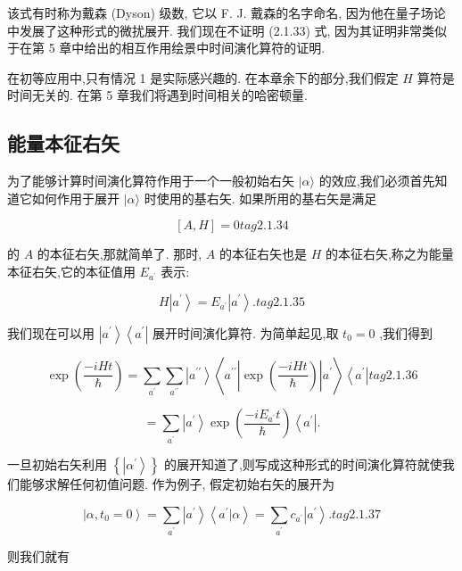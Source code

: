 \documentclass[lang=cn,newtx,10pt,scheme=chinese,thmcnt=section]{elegantbook}
\begin{document}
该式有时称为戴森 (Dyson) 级数, 它以 F. J. 戴森的名字命名, 因为他在量子场论中发展了这种形式的微扰展开. 我们现在不证明 (2.1.33) 式, 因为其证明非常类似于在第 5 章中给出的相互作用绘景中时间演化算符的证明.

在初等应用中,只有情况 1 是实际感兴趣的. 在本章余下的部分,我们假定 $H$ 算符是时间无关的. 在第 5 章我们将遇到时间相关的哈密顿量.

\subsection*{能量本征右矢}

为了能够计算时间演化算符作用于一个一般初始右矢 $|\alpha \rangle$ 的效应,我们必须首先知道它如何作用于展开 $|\alpha \rangle$ 时使用的基右矢. 如果所用的基右矢是满足

$$
\left\lbrack {A, H}\right\rbrack = 0 tag{2.1.34}
$$

的 $A$ 的本征右矢,那就简单了. 那时, $A$ 的本征右矢也是 $H$ 的本征右矢,称之为能量本征右矢,它的本征值用 ${E}_{{a}^{\prime }}$ 表示:

$$
H\left| {a}^{\prime }\right\rangle = {E}_{{a}^{\prime }}\left| {a}^{\prime }\right\rangle . tag{2.1.35}
$$

我们现在可以用 $\left| {a}^{\prime }\right\rangle \left\langle {a}^{\prime }\right|$ 展开时间演化算符. 为简单起见,取 ${t}_{0} = 0$ ,我们得到

$$
\exp \left( \frac{-{iHt}}{\hbar }\right) = \mathop{\sum }\limits_{{a}^{\prime }}\mathop{\sum }\limits_{{a}^{\prime \prime }}\left| {a}^{\prime \prime }\right\rangle \left\langle {{a}^{\prime \prime }\left| {\exp \left( \frac{-{iHt}}{\hbar }\right) }\right| {a}^{\prime }}\right\rangle \left\langle {a}^{\prime }\right| tag{2.1.36}
$$

$$
= \mathop{\sum }\limits_{{a}^{\prime }}\left| {a}^{\prime }\right\rangle \exp \left( \frac{-i{E}_{{a}^{\prime }}t}{\hbar }\right) \left\langle {a}^{\prime }\right| .
$$

一旦初始右矢利用 $\left\{ \left| {\alpha }^{\prime }\right\rangle \right\}$ 的展开知道了,则写成这种形式的时间演化算符就使我们能够求解任何初值问题. 作为例子, 假定初始右矢的展开为

$$
\left| {\alpha ,{t}_{0} = 0}\right\rangle = \mathop{\sum }\limits_{{a}^{\prime }}\left| {a}^{\prime }\right\rangle \left\langle {{a}^{\prime } | \alpha }\right\rangle = \mathop{\sum }\limits_{{a}^{\prime }}{c}_{{a}^{\prime }}\left| {a}^{\prime }\right\rangle . tag{2.1.37}
$$

则我们就有
\end{document}
